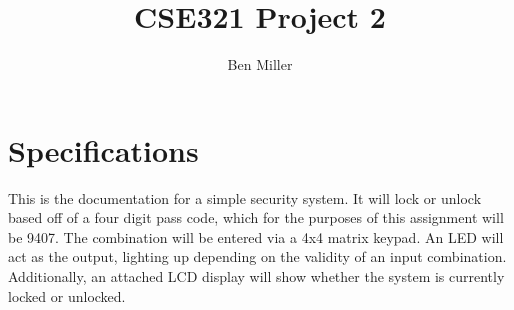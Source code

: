 \documentclass[10pt,a4paper]{article}
\author{Ben Miller}
\title{CSE321 Project 2}
\begin{document}
\maketitle
\pagebreak
\tableofcontents
\pagebreak
\section{Specifications}
This is the documentation for a simple security system. It will lock or unlock based off of a four digit pass code, which for the purposes of this assignment will be 9407. The combination will be entered via a 4x4 matrix keypad. An LED will act as the output, lighting up depending on the validity of an input combination. Additionally, an attached LCD display will show whether the system is currently locked or unlocked.
\pagebreak
\end{document}
